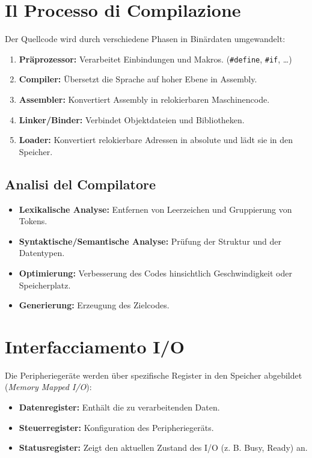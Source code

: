 \section{Il Processo di Compilazione}
Der Quellcode wird durch verschiedene Phasen in Binärdaten umgewandelt:

\begin{enumerate}
    \item \textbf{Präprozessor:} Verarbeitet Einbindungen und Makros. (\texttt{\#define}, \texttt{\#if}, \dots)
    \item \textbf{Compiler:} Übersetzt die Sprache auf hoher Ebene in Assembly.
    \item \textbf{Assembler:} Konvertiert Assembly in relokierbaren Maschinencode.
    \item \textbf{Linker/Binder:} Verbindet Objektdateien und Bibliotheken.
    \item \textbf{Loader:} Konvertiert relokierbare Adressen in absolute und lädt sie in den Speicher.
\end{enumerate}

\subsection{Analisi del Compilatore}
\begin{itemize}
    \item \textbf{Lexikalische Analyse:} Entfernen von Leerzeichen und Gruppierung von Tokens.
    \item \textbf{Syntaktische/Semantische Analyse:} Prüfung der Struktur und der Datentypen.
    \item \textbf{Optimierung:} Verbesserung des Codes hinsichtlich Geschwindigkeit oder Speicherplatz.
    \item \textbf{Generierung:} Erzeugung des Zielcodes.
\end{itemize}

\section{Interfacciamento I/O}
Die Peripheriegeräte werden über spezifische Register in den Speicher abgebildet (\textit{Memory Mapped I/O}):
\begin{itemize}
    \item \textbf{Datenregister:} Enthält die zu verarbeitenden Daten.
    \item \textbf{Steuerregister:} Konfiguration des Peripheriegeräts.
    \item \textbf{Statusregister:} Zeigt den aktuellen Zustand des I/O (z. B. Busy, Ready) an.
\end{itemize}


